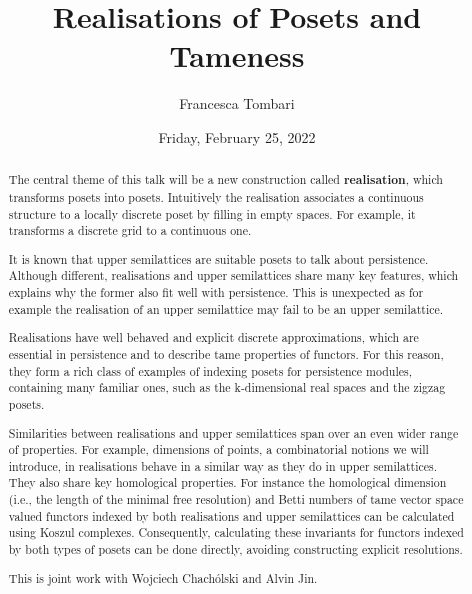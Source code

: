 \documentclass{UAmathtalk}
\author{Francesca Tombari}
\title{Realisations of Posets and Tameness}
\date{Friday, February 25, 2022}
\begin{document}
\maketitle

\begin{abstract}
The central theme of this talk will be a new construction called \textbf{realisation}, which transforms posets into posets. Intuitively the realisation associates a continuous structure to a locally discrete poset by filling in empty spaces. For example, it transforms a discrete grid to a continuous one. 

It is known that upper semilattices are suitable posets to talk about persistence. Although different, realisations and upper semilattices share many key features, which explains why the former also fit well with persistence. This is unexpected as for example the realisation of an upper semilattice may fail to be an upper semilattice.

Realisations have well behaved and explicit discrete approximations, which are essential in persistence and to describe tame properties of functors. For this reason, they form a rich class of examples of indexing posets for persistence modules, containing many familiar ones, such as the k-dimensional real spaces and the zigzag posets.

Similarities between realisations and upper semilattices span over an even wider range of properties. For example, dimensions of points, a combinatorial notions we will introduce, in realisations behave in a similar way as they do in upper semilattices. They also share key homological properties. For instance the homological dimension (i.e., the length of the minimal free resolution) and Betti numbers of tame vector space valued functors indexed by both realisations and upper semilattices can be calculated using Koszul complexes. Consequently, calculating these invariants for functors indexed by both types of posets can be done directly, avoiding constructing explicit resolutions. 

This is joint work with Wojciech Chach\'{o}lski and Alvin Jin.
\end{abstract}
\end{document}
